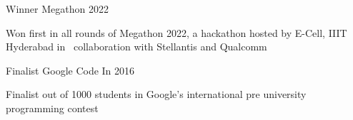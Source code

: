 
\begin{cventries}

  \cventry
    {Winner} %
    {Megathon} %
    {} %
    {2022} %
    {
      \begin{cvitems} %
		\item{Won first in all rounds of Megathon 2022, a hackathon hosted by E-Cell, IIIT Hyderabad in \ 
		collaboration with Stellantis and Qualcomm}
      \end{cvitems}
    }
	\cventry
    {Finalist} %
    {Google Code In} %
    {} %
    {2016} %
    {
      \begin{cvitems} %
		\item{Finalist out of 1000 students in Google's international pre university programming contest}
      \end{cvitems}
    }
\end{cventries}
